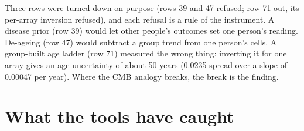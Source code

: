 

Three rows were turned down on purpose (rows 39 and 47 refused; row 71 out, its per-array inversion refused), and each refusal is a rule of the instrument. A disease prior (row 39) would let other people's
outcomes set one person's reading. De-ageing (row 47) would subtract a group trend from one person's cells. A group-built age ladder (row
71) measured the wrong thing: inverting it for one array gives an age uncertainty of about 50 years (0.0235 spread over a slope of 0.00047 per year). \calc{} Where the CMB analogy breaks, the break is
the finding.

\section{What the tools have caught}


